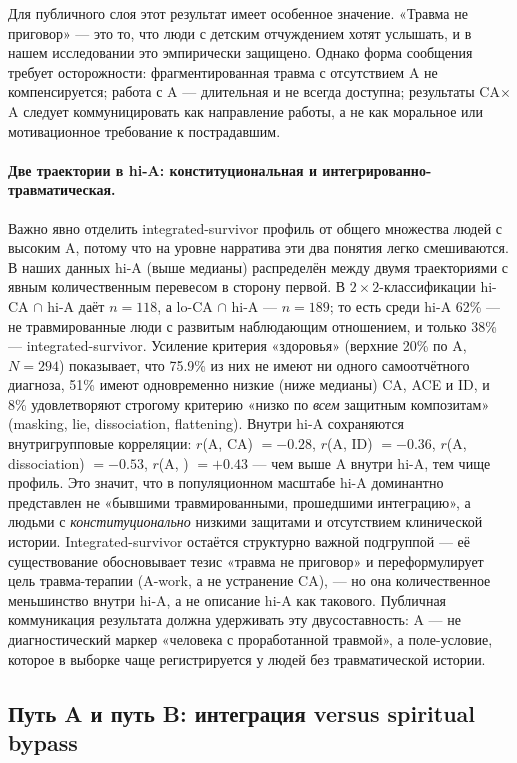 Для публичного слоя этот результат имеет особенное значение. «Травма не приговор» --- это то, что люди с детским отчуждением хотят услышать, и в нашем исследовании это эмпирически защищено. Однако форма сообщения требует осторожности: фрагментированная травма с отсутствием A не компенсируется; работа с A --- длительная и не всегда доступна; результаты CA$\times$A следует коммуницировать как направление работы, а не как моральное или мотивационное требование к пострадавшим.

\paragraph{Две траектории в hi-A: конституциональная и интегрированно-травматическая.} Важно явно отделить integrated-survivor профиль от общего множества людей с высоким A, потому что на уровне нарратива эти два понятия легко смешиваются. В наших данных hi-A (выше медианы) распределён между двумя траекториями с явным количественным перевесом в сторону первой. В $2\times 2$-классификации hi-CA $\cap$ hi-A даёт $n = 118$, а lo-CA $\cap$ hi-A --- $n = 189$; то есть среди hi-A 62\% --- не травмированные люди с развитым наблюдающим отношением, и только 38\% --- integrated-survivor. Усиление критерия «здоровья» (верхние 20\% по A, $N = 294$) показывает, что 75.9\% из них не имеют ни одного самоотчётного диагноза, 51\% имеют одновременно низкие (ниже медианы) CA, ACE и ID, и 8\% удовлетворяют строгому критерию «низко по \emph{всем} защитным композитам» (masking, lie, dissociation, flattening). Внутри hi-A сохраняются внутригрупповые корреляции: $r$(A, CA) $= -0.28$, $r$(A, ID) $= -0.36$, $r$(A, dissociation) $= -0.53$, $r$(A, \EAF) $= +0.43$ --- чем выше A внутри hi-A, тем чище профиль. Это значит, что в популяционном масштабе hi-A доминантно представлен не «бывшими травмированными, прошедшими интеграцию», а людьми с \emph{конституционально} низкими защитами и отсутствием клинической истории. Integrated-survivor остаётся структурно важной подгруппой --- её существование обосновывает тезис «травма не приговор» и переформулирует цель травма-терапии (A-work, а не устранение CA), --- но она количественное меньшинство внутри hi-A, а не описание hi-A как такового. Публичная коммуникация результата должна удерживать эту двусоставность: A --- не диагностический маркер «человека с проработанной травмой», а поле-условие, которое в выборке чаще регистрируется у людей без травматической истории.

\subsection{Путь A и путь B: интеграция versus spiritual bypass}
\label{subsec:bypass}

